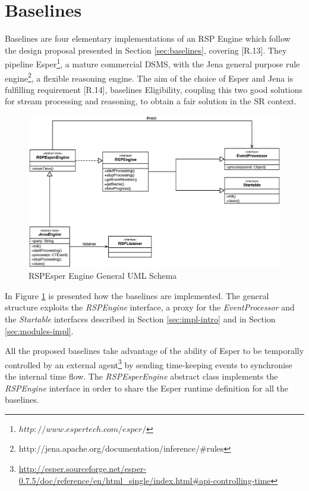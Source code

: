 \section{Baselines}\label{sec:baselines-impl}

\name Baselines are four elementary implementations of an RSP Engine which follow the design proposal presented in Section \ref{sec:baselines}, covering [R.13]. They pipeline Esper\footnote{$http://www.espertech.com/esper/$}, a mature commercial DSMS, with the Jena general purpose rule engine\footnote{http://jena.apache.org/documentation/inference/\#rules
}, a flexible reasoning engine. The aim of the choice of Esper and Jena is fulfilling requirement [R.14], baselines Eligibility, coupling this two good solutions for stream processing and reasoning, to obtain a fair solution in the SR context. 

\begin{figure}[tbh]
  \centering
	\includegraphics[width=\linewidth]{images/uml_baselines_general}
	\caption{RSPEsper Engine General UML Schema} 
  	\label{fig:uml_baselines_general}
\end{figure}

In Figure \ref{fig:uml_baselines_general} is presented how the baselines are implemented. The general structure exploits the \textit{RSPEngine} interface, a proxy for the \textit{EventProcessor} and the \textit{Startable}  interfaces described in Section \ref{sec:impl-intro} and in Section \ref{sec:modules-impl}. 

All the proposed baselines take advantage of the ability of Esper to be temporally controlled by an external agent\footnote{\url{http://esper.sourceforge.net/esper-0.7.5/doc/reference/en/html_single/index.html#api-controlling-time}} by sending time-keeping events to synchronise the internal time flow. The \textit{RSPEsperEngine} abstract class implements the \textit{RSPEngine} interface in order to share the Esper runtime definition for all the baselines. 

